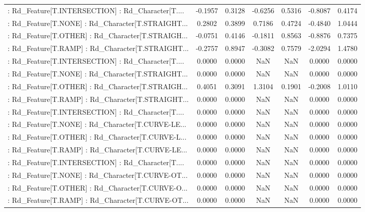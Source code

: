 \begin{longtable}{p{4cm}cccccc}
 : Rd\_Feature[T.INTERSECTION] : Rd\_Character[T.... & -0.1957 &    0.3128 & -0.6256 &       0.5316 & -0.8087 &  0.4174 \\
 : Rd\_Feature[T.NONE] : Rd\_Character[T.STRAIGHT... &  0.2802 &    0.3899 &  0.7186 &       0.4724 & -0.4840 &  1.0444 \\
 : Rd\_Feature[T.OTHER] : Rd\_Character[T.STRAIGH... & -0.0751 &    0.4146 & -0.1811 &       0.8563 & -0.8876 &  0.7375 \\
 : Rd\_Feature[T.RAMP] : Rd\_Character[T.STRAIGHT... & -0.2757 &    0.8947 & -0.3082 &       0.7579 & -2.0294 &  1.4780 \\
 : Rd\_Feature[T.INTERSECTION] : Rd\_Character[T.... &  0.0000 &    0.0000 &     NaN &          NaN &  0.0000 &  0.0000 \\
 : Rd\_Feature[T.NONE] : Rd\_Character[T.STRAIGHT... &  0.0000 &    0.0000 &     NaN &          NaN &  0.0000 &  0.0000 \\
 : Rd\_Feature[T.OTHER] : Rd\_Character[T.STRAIGH... &  0.4051 &    0.3091 &  1.3104 &       0.1901 & -0.2008 &  1.0110 \\
 : Rd\_Feature[T.RAMP] : Rd\_Character[T.STRAIGHT... &  0.0000 &    0.0000 &     NaN &          NaN &  0.0000 &  0.0000 \\
 : Rd\_Feature[T.INTERSECTION] : Rd\_Character[T.... &  0.0000 &    0.0000 &     NaN &          NaN &  0.0000 &  0.0000 \\
 : Rd\_Feature[T.NONE] : Rd\_Character[T.CURVE-LE... &  0.0000 &    0.0000 &     NaN &          NaN &  0.0000 &  0.0000 \\
 : Rd\_Feature[T.OTHER] : Rd\_Character[T.CURVE-L... &  0.0000 &    0.0000 &     NaN &          NaN &  0.0000 &  0.0000 \\
 : Rd\_Feature[T.RAMP] : Rd\_Character[T.CURVE-LE... &  0.0000 &    0.0000 &     NaN &          NaN &  0.0000 &  0.0000 \\
 : Rd\_Feature[T.INTERSECTION] : Rd\_Character[T.... &  0.0000 &    0.0000 &     NaN &          NaN &  0.0000 &  0.0000 \\
 : Rd\_Feature[T.NONE] : Rd\_Character[T.CURVE-OT... &  0.0000 &    0.0000 &     NaN &          NaN &  0.0000 &  0.0000 \\
 : Rd\_Feature[T.OTHER] : Rd\_Character[T.CURVE-O... &  0.0000 &    0.0000 &     NaN &          NaN &  0.0000 &  0.0000 \\
 : Rd\_Feature[T.RAMP] : Rd\_Character[T.CURVE-OT... &  0.0000 &    0.0000 &     NaN &          NaN &  0.0000 &  0.0000 \\

\end{longtable}
